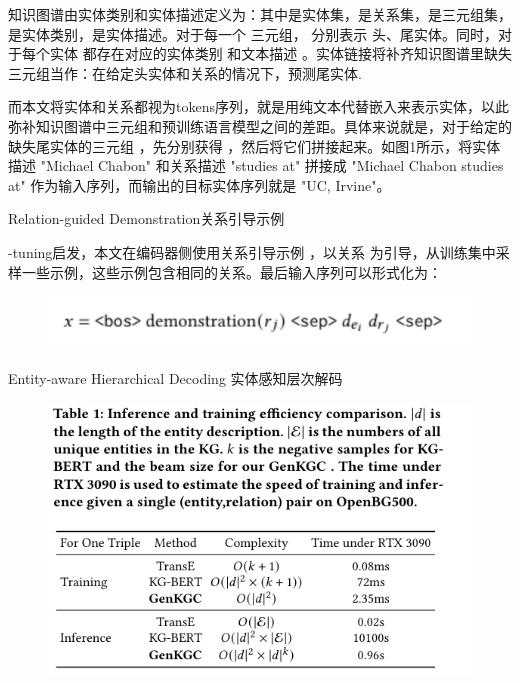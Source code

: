 \documentclass{article}
\begin{document}
\par 知识图谱由实体类别和实体描述定义为：其中是实体集，是关系集，是三元组集，是实体类别，是实体描述。对于每一个 三元组， 分别表示 头、尾实体。同时，对于每个实体 都存在对应的实体类别 和文本描述 。实体链接将补齐知识图谱里缺失三元组当作：在给定头实体和关系的情况下，预测尾实体.

\par 而本文将实体和关系都视为tokens序列，就是用纯文本代替嵌入来表示实体，以此弥补知识图谱中三元组和预训练语言模型之间的差距。具体来说就是，对于给定的缺失尾实体的三元组 ，先分别获得 ，然后将它们拼接起来。如图1所示，将实体描述 "Michael Chabon" 和关系描述 "studies at" 拼接成 "Michael Chabon studies at" 作为输入序列，而输出的目标实体序列就是 "UC, Irvine"。

\par Relation-guided Demonstration关系引导示例

-tuning启发，本文在编码器侧使用关系引导示例 ，以关系 为引导，从训练集中采样一些示例，这些示例包含相同的关系。最后输入序列可以形式化为：
\begin{figure}[htp]
        \centering
        \includegraphics[width=16cm]{序列形式化.png}
        \label{pic7}
\end{figure}

\newpage

\par Entity-aware Hierarchical Decoding
实体感知层次解码
\begin{figure}[htp]
        \centering
        \includegraphics[width=16cm]{1.png}
        \label{pic7}
\end{figure}
\end{document}
